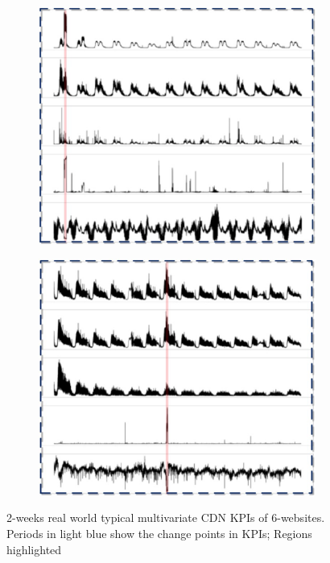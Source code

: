 \documentclass[letterpaper,12pt]{article}
\begin{document}
\begin{figure}[htbp]
\begin{subfigure}{0.2\textwidth}
			\captionsetup{font=scriptsize}
			\caption{}
			\label{fig: cdn_kpi_d}
		\end{subfigure}
		\begin{subfigure}{0.2\textwidth}
			\includegraphics[width=\linewidth]{CDN_KPI/cdn_kpi_e}
			\captionsetup{font=scriptsize}
			\caption{}
			\label{fig: cdn_kpi_e}
		\end{subfigure}
		\begin{subfigure}{0.2\textwidth}
			\includegraphics[width=\linewidth]{CDN_KPI/cdn_kpi_f}
			\captionsetup{font=scriptsize}
			\caption{}
			\label{fig: cdn_kpi_f}	
		\end{subfigure}	
		\captionsetup{font=scriptsize}
		\caption{
			\label{fig: CDN_KPI} %
			2-weeks real world typical multivariate CDN KPIs of 6-websites. Periods in light blue show the change points in KPIs; Regions highlighted
		}
	\end{figure}
	
\end{document}
